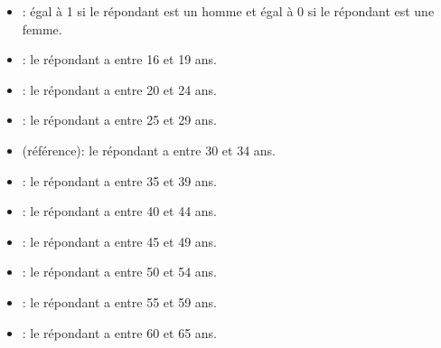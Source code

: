 \documentclass[letterpaper,10pt,french]{sphinxmanual}
\begin{document}

\begin{itemize}
\item {} 
: égal à 1 si le répondant est un homme et égal à 0 si le répondant est une femme.

\end{itemize}

\begin{itemize}
\item {} 
: le répondant a entre 16 et 19 ans.

\item {} 
: le répondant a entre 20 et 24 ans.

\item {} 
: le répondant a entre 25 et 29 ans.

\item {} 
 (référence): le répondant a entre 30 et 34 ans.

\item {} 
: le répondant a entre 35 et 39 ans.

\item {} 
: le répondant a entre 40 et 44 ans.

\item {} 
: le répondant a entre 45 et 49 ans.

\item {} 
: le répondant a entre 50 et 54 ans.

\item {} 
: le répondant a entre 55 et 59 ans.

\item {} 
: le répondant a entre 60 et 65 ans.

\end{itemize}
\end{document}
